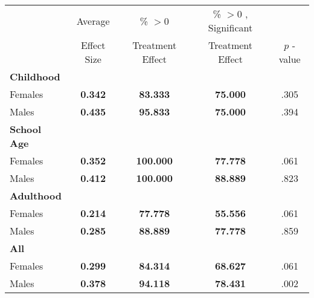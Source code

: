 \begin{tabular}{l c c c c}
\toprule
 & Average & \% $ >0 $ & \% $ >0 $ , Significant & \citet{Rosenbaum_2005_Distribution_JRSS} \\
 & Effect Size & Treatment Effect & Treatment Effect & $ p $ -value \\
\midrule
\textbf{Childhood} & & & & \\
\quad Females &  \textbf{    0.342} & \textbf{   83.333} & \textbf{   75.000} & .305 \\
\quad Males &  \textbf{    0.435} & \textbf{   95.833} & \textbf{   75.000} & .394 \\
\midrule
\textbf{School Age} & & & & \\
\quad Females &  \textbf{    0.352} & \textbf{  100.000} & \textbf{   77.778} & .061 \\
\quad Males &  \textbf{    0.412} & \textbf{  100.000} & \textbf{   88.889} & .823 \\
\midrule
\textbf{Adulthood} & & & & \\
\quad Females &  \textbf{    0.214} & \textbf{   77.778} & \textbf{   55.556} & .061 \\
\quad Males &  \textbf{    0.285} & \textbf{   88.889} & \textbf{   77.778} & .859 \\
\midrule
\textbf{All} & & & & \\
\quad Females &  \textbf{    0.299} & \textbf{   84.314} & \textbf{   68.627} & .061 \\
\quad Males &  \textbf{    0.378} & \textbf{   94.118} & \textbf{   78.431} & .002 \\
\bottomrule
\end{tabular}
